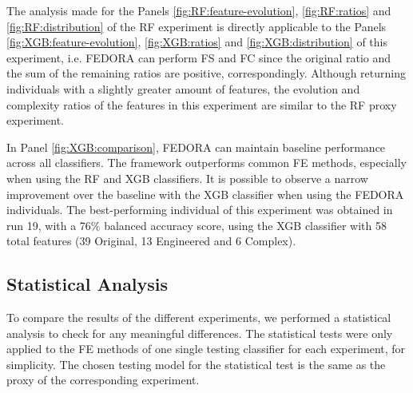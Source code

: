 The analysis made for the Panels \ref{fig:RF:feature-evolution}, \ref{fig:RF:ratios} and \ref{fig:RF:distribution} of the RF experiment is directly applicable to the Panels \ref{fig:XGB:feature-evolution}, \ref{fig:XGB:ratios} and \ref{fig:XGB:distribution} of this experiment, i.e. FEDORA can perform \gls{FS} and \gls{FC} since the original ratio and the sum of the remaining ratios are positive, correspondingly. Although returning individuals with a slightly greater amount of features, the evolution and complexity ratios of the features in this experiment are similar to the \gls{RF} proxy experiment.

In Panel \ref{fig:XGB:comparison}, FEDORA can maintain baseline performance across all classifiers. The framework outperforms common \gls{FE} methods, especially when using the \gls{RF} and \gls{XGB} classifiers. It is possible to observe a narrow improvement over the baseline with the \gls{XGB} classifier when using the FEDORA individuals. The best-performing individual of this experiment was obtained in run 19, with a 76\% balanced accuracy score, using the \gls{XGB} classifier with 58 total features (39 Original, 13 Engineered and 6 Complex).


\subsection{Statistical Analysis}
To compare the results of the different experiments, we performed a statistical analysis to check for any meaningful differences. The statistical tests were only applied to the \gls{FE} methods of one single testing classifier for each experiment, for simplicity. The chosen testing model for the statistical test is the same as the proxy of the corresponding experiment.

